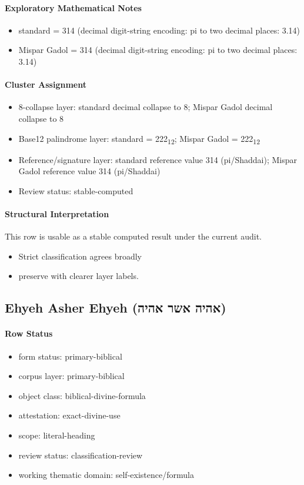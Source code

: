 \paragraph{Exploratory Mathematical Notes}
\begin{itemize}
\item standard = 314 (decimal digit-string encoding: pi to two decimal places: 3.14)
\item Mispar Gadol = 314 (decimal digit-string encoding: pi to two decimal places: 3.14)
\end{itemize}
\paragraph{Cluster Assignment}
\begin{itemize}
\item 8-collapse layer: standard decimal collapse to 8; Mispar Gadol decimal collapse to 8
\item Base12 palindrome layer: standard = 222\textsubscript{12}; Mispar Gadol = 222\textsubscript{12}
\item Reference/signature layer: standard reference value 314 (pi/Shaddai); Mispar Gadol reference value 314 (pi/Shaddai)
\item Review status: stable-computed
\end{itemize}
\paragraph{Structural Interpretation}
This row is usable as a stable computed result under the current audit.

\begin{itemize}
\item Strict classification agrees broadly
\item preserve with clearer layer labels.
\end{itemize}

\subsection{Ehyeh Asher Ehyeh (אהיה אשר אהיה)}
\paragraph{Row Status}
\begin{itemize}
\item form status: primary-biblical
\item corpus layer: primary-biblical
\item object class: biblical-divine-formula
\item attestation: exact-divine-use
\item scope: literal-heading
\item review status: classification-review
\item working thematic domain: self-existence/formula
\end{itemize}
